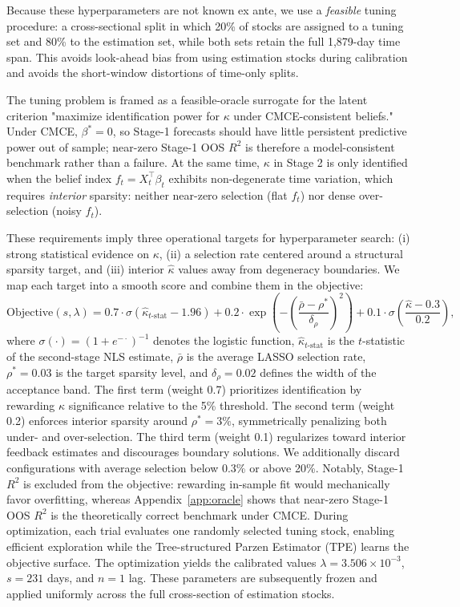 \documentclass[11pt]{article}
\begin{document}
Because these hyperparameters are not known ex ante, we use a \emph{feasible} tuning procedure: a cross-sectional split in which 20\% of stocks are assigned to a tuning set and 80\% to the estimation set, while both sets retain the full 1,879-day time span.
This avoids look-ahead bias from using estimation stocks during calibration and avoids the short-window distortions of time-only splits.

The tuning problem is framed as a feasible-oracle surrogate for the latent criterion
"maximize identification power for $\kappa$ under CMCE-consistent beliefs."
Under CMCE, $\beta^*=0$, so Stage-1 forecasts should have little persistent predictive power out of sample; near-zero Stage-1 OOS $R^2$ is therefore a model-consistent benchmark rather than a failure.
At the same time, $\kappa$ in Stage 2 is only identified when the belief index $f_t=X_t^\top\beta_t$ exhibits non-degenerate time variation, which requires \emph{interior} sparsity: neither near-zero selection (flat $f_t$) nor dense over-selection (noisy $f_t$).

These requirements imply three operational targets for hyperparameter search:
(i) strong statistical evidence on $\kappa$,
(ii) a selection rate centered around a structural sparsity target,
and (iii) interior $\hat\kappa$ values away from degeneracy boundaries.
We map each target into a smooth score and combine them in the objective:
\begin{equation}\label{eq:hyperpar_objective}
\text{Objective}(s, \lambda) = 0.7 \cdot \sigma\left(\hat\kappa_{t\text{-stat}} - 1.96\right) + 0.2 \cdot \exp\left(-\left(\frac{\bar\rho - \rho^*}{\delta_\rho}\right)^{\!2}\right) + 0.1 \cdot \sigma\left(\frac{\hat\kappa - 0.3}{0.2}\right),
\end{equation}
where $\sigma(\cdot) = (1 + e^{-\cdot})^{-1}$ denotes the logistic function, $\hat\kappa_{t\text{-stat}}$ is the $t$-statistic of the second-stage NLS estimate, $\bar\rho$ is the average LASSO selection rate, $\rho^* = 0.03$ is the target sparsity level, and $\delta_\rho = 0.02$ defines the width of the acceptance band.
The first term (weight 0.7) prioritizes identification by rewarding $\kappa$ significance relative to the 5\% threshold.
The second term (weight 0.2) enforces interior sparsity around $\rho^*=3\%$, symmetrically penalizing both under- and over-selection.
The third term (weight 0.1) regularizes toward interior feedback estimates and discourages boundary solutions.
We additionally discard configurations with average selection below 0.3\% or above 20\%.
Notably, Stage-1 $R^2$ is excluded from the objective: rewarding in-sample fit would mechanically favor overfitting, whereas Appendix~\ref{app:oracle} shows that near-zero Stage-1 OOS $R^2$ is the theoretically correct benchmark under CMCE.
During optimization, each trial evaluates one randomly selected tuning stock, enabling efficient exploration while the Tree-structured Parzen Estimator (TPE) learns the objective surface.
The optimization yields the calibrated values $\lambda = 3.506 \times 10^{-3}$, $s = 231$ days, and $n = 1$ lag.
These parameters are subsequently frozen and applied uniformly across the full cross-section of estimation stocks.
\end{document}
